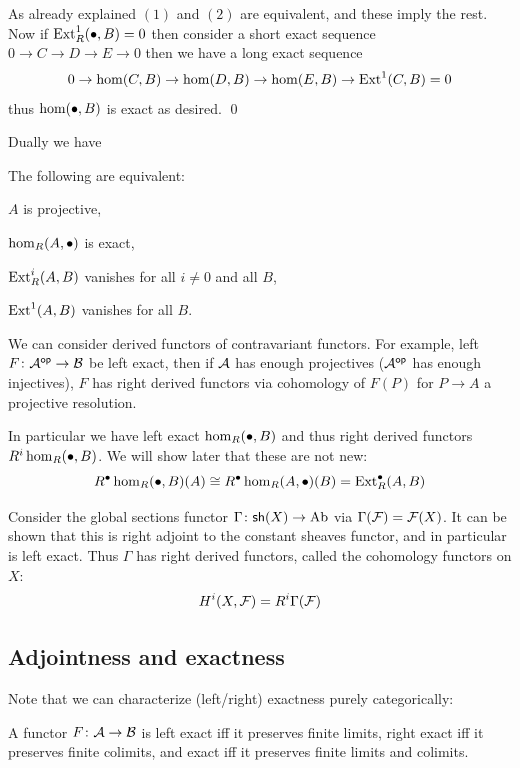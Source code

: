 \bproof

    As already explained $(1)$ and $(2)$ are equivalent, and these imply the rest.
    Now if ${\rm Ext}^1_R(\bullet,B)=0$ then consider a short exact sequence $0\to C\to D\to E\to0$ then we have a long exact sequence
    $$ 0 \to \hom(C,B) \to \hom(D,B) \to \hom(E,B) \to {\rm Ext}^1(C,B) = 0 $$
    thus $\hom(\bullet,B)$ is exact as desired.
    \qed

\eproof

Dually we have

\bprop

    The following are equivalent:
    \benum
        \item $A$ is projective,
        \item $\hom_R(A,\bullet)$ is exact,
        \item ${\rm Ext}^i_R(A,B)$ vanishes for all $i\neq0$ and all $B$,
        \item ${\rm Ext}^1(A,B)$ vanishes for all $B$.
    \eenum

\eprop

We can consider derived functors of contravariant functors.
For example, left $F\colon{{\cal A}}^{\sf op}\to{{\cal B}}$ be left exact, then if ${{\cal A}}$ has enough projectives (${{\cal A}}^{\sf op}$ has enough injectives), $F$ has right derived functors via cohomology of
$F(P)$ for $P\to A$ a projective resolution.

In particular we have left exact $\hom_R(\bullet,B)$ and thus right derived functors $R^i\hom_R(\bullet,B)$.
We will show later that these are not new:
$$ R^\bullet\hom_R(\bullet,B)(A) \cong R^\bullet\hom_R(A,\bullet)(B) = {\rm Ext}_R^\bullet(A,B) $$

\bexam

    Consider the {\emphcolor global sections} functor $\Gamma\colon{\sf sh}(X)\to{\rm Ab}$ via $\Gamma({{\cal F}})={{\cal F}}(X)$.
    It can be shown that this is right adjoint to the constant sheaves functor, and in particular is left exact.
    Thus $\Gamma$ has right derived functors, called the {\emphcolor cohomology functors} on $X$:
    $$ H^i(X,{{\cal F}}) = R^i\Gamma({{\cal F}}) $$

\eexam

\subsection{Adjointness and exactness}

Note that we can characterize (left/right) exactness purely categorically:

\blemm

    A functor $F\colon{{\cal A}}\to{{\cal B}}$ is left exact iff it preserves finite limits, right exact iff it preserves finite colimits, and exact iff it preserves finite
    limits and colimits.

